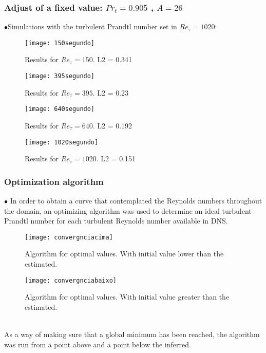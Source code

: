 \documentclass[xcolor=dvipsnames,8pt,aspectratio=34]{beamer}
\begin{document}
		
		
		
		
		\begin{frame}
		\frametitle{Adjust of a fixed value: $Pr_t = 0.905$ , $A = 26$}
		$\bullet$Simulations with the turbulent Prandtl number set in $Re_\tau = 1020$:  \\
		\begin{minipage}[h!]{0.45\textwidth}
			 \begin{figure}
			 	\centering
			 	\texttt{[image: 150segundo]}
			 	\caption{Results for $Re_\tau = 150$. L2 = 0.341}
			 \end{figure}
			 \begin{figure}
			 	\centering
			 	\texttt{[image: 395segundo]}
			 	\caption{Results for $Re_\tau = 395$. L2 = 0.23}
			 \end{figure}
		\end{minipage}\hfill
		\begin{minipage}[h!]{0.45\textwidth}
			\begin{figure}
				\centering
				\texttt{[image: 640segundo]}
				\caption{Results for $Re_\tau = 640$. L2 = 0.192}
			\end{figure}
			\begin{figure}
				\centering
				\texttt{[image: 1020segundo]}
				\caption{Results for $Re_\tau = 1020$. L2 = 0.151}
			\end{figure}
		\end{minipage}		
		\end{frame}	
	
	
	
	
	
	
		\begin{frame}
		\frametitle{Optimization algorithm}
		$\bullet$ In order to obtain a curve that contemplated the Reynolds numbers throughout the domain, an optimizing algorithm was used to determine an ideal turbulent Prandtl number for each turbulent Reynolds number available in DNS.\\
		\begin{minipage}[h!]{0.5\textwidth}
			\begin{figure}
				\centering
				\texttt{[image: convergnciacima]}
				\caption{Algorithm for optimal values. With initial value lower than the estimated.}
			\end{figure}
		\end{minipage}
		\begin{minipage}[h!]{0.45\textwidth}
			\begin{figure}
				\centering
				\texttt{[image: convergnciabaixo]}
				\caption{Algorithm for optimal values. With initial value greater than the estimated.}
			\end{figure}
		\end{minipage}\\
	As a way of making sure that a global minimum has been reached, the algorithm was run from a point above and a point below the inferred.	
		\end{frame}
	
\end{document}
